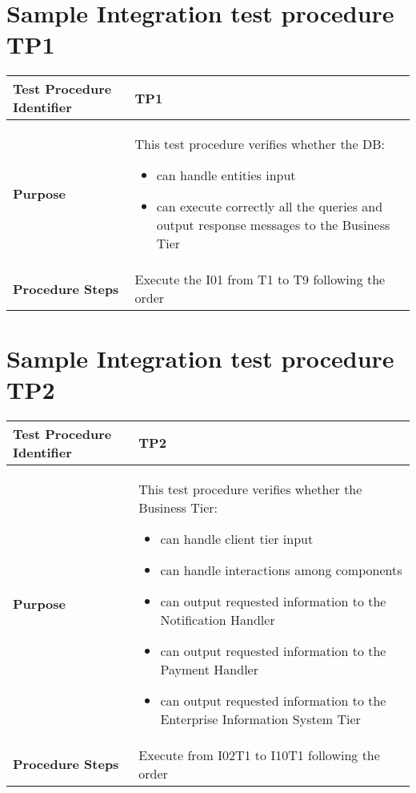 \section{Sample Integration test procedure TP1} \label{TP1}
\begin{center}
	\vspace{0.6cm}
	\begin{tabular}{|l|p{9cm}|}
		\hline
		\textbf{Test Procedure Identifier} & TP1 \bigstrut \\\hline
		\textbf{Purpose} 
		& This test procedure verifies whether the DB: 
		\begin{itemize} 
			\item can handle entities input
			\item can execute correctly all the queries and output response messages to the Business Tier %
		\end{itemize} \bigstrut \\\hline
		\textbf{Procedure Steps} & Execute the I01 from T1 to T9 following the order \bigstrut \\\hline
	\end{tabular}
\end{center}

\section{Sample Integration test procedure TP2} \label{TP2}
\begin{center}
	\vspace{0.6cm}
	\begin{tabular}{|l|p{9cm}|}
		\hline
		\textbf{Test Procedure Identifier} & TP2 \bigstrut \\\hline
		\textbf{Purpose} 
		& This test procedure verifies whether the Business Tier: 
		\begin{itemize} 
			\item can handle client tier input
			\item can handle interactions among components 
			\item can output requested information to the Notification Handler
			\item can output requested information to the Payment Handler
			\item can output requested information to the Enterprise Information System Tier
		\end{itemize} \bigstrut \\\hline
		\textbf{Procedure Steps} & Execute from I02T1 to I10T1 following the order \bigstrut \\\hline %
	\end{tabular}
\end{center}

